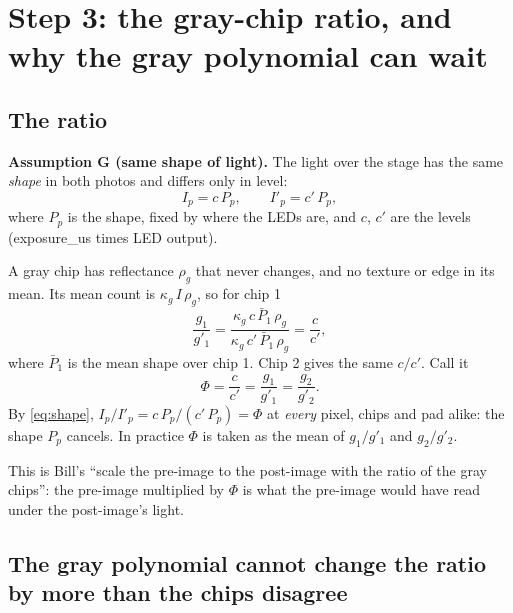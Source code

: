 \documentclass[11pt,letter]{article}
\begin{document}
\section{Step 3: the gray-chip ratio, and why the gray polynomial can wait}
\label{sec:phi}

\subsection{The ratio}

\textbf{Assumption G (same shape of light).}  The light over the stage has
the same \emph{shape} in both photos and differs only in level:
\begin{equation}
  I_p = c\, P_p, \qquad I'_p = c'\, P_p ,
  \label{eq:shape}
\end{equation}
where $P_p$ is the shape, fixed by where the LEDs are, and $c$, $c'$ are
the levels (exposure\_us times LED output).

A gray chip has reflectance $\rho_g$ that never changes, and no texture or
edge in its mean.  Its mean count is $\kappa_g\, I\, \rho_g$, so for chip 1
\begin{equation}
  \frac{g_1}{g'_1} = \frac{\kappa_g\, c\, \bar P_1\, \rho_g}
                          {\kappa_g\, c'\, \bar P_1\, \rho_g}
                   = \frac{c}{c'} ,
\end{equation}
where $\bar P_1$ is the mean shape over chip 1.  Chip 2 gives the same
$c/c'$.  Call it
\begin{equation}
  \Phi = \frac{c}{c'} = \frac{g_1}{g'_1} = \frac{g_2}{g'_2} .
  \label{eq:phi}
\end{equation}
By \eqref{eq:shape}, $I_p / I'_p = c\,P_p / (c'\,P_p) = \Phi$ at
\emph{every} pixel, chips and pad alike: the shape $P_p$ cancels.  In
practice $\Phi$ is taken as the mean of $g_1/g'_1$ and $g_2/g'_2$.

This is Bill's ``scale the pre-image to the post-image with the ratio of
the gray chips'': the pre-image multiplied by $\Phi$ is what the pre-image
would have read under the post-image's light.

\subsection{The gray polynomial cannot change the ratio by more than the
chips disagree}
\end{document}
